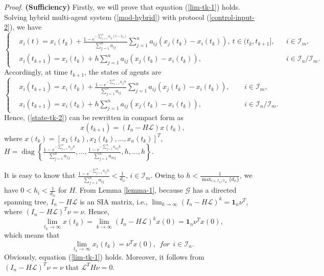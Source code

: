 \documentclass[12pt,draftcls,onecolumn]{IEEEtran}
\DeclareMathOperator{\diag}{diag}
\begin{document}
{\it Proof.} \textbf{(Sufficiency)} Firstly, we will prove that equation (\ref{lim-tk-1}) holds. Solving hybrid multi-agent system (\ref{mod-hybrid}) with protocol (\ref{control-input-2}), we have
\begin{equation}\label{state-t-2}
\left\{
\begin{aligned}
&x_i(t)=x_i(t_k)+\frac{1-e^{-\sum_{j=1}^na_{ij}(t-t_k)}}{\sum_{j=1}^na_{ij}}\sum_{j=1}^na_{ij}(x_j(t_k)-x_i(t_k)),~t\in (t_k,t_{k+1}], &&i\in \mathcal{I}_m,\\
&x_i(t_{k+1})=x_i(t_k)+h\sum_{j=1}^na_{ij}(x_j(t_k)-x_i(t_k)), && i\in\mathcal{I}_{n}/\mathcal{I}_{m}.
\end{aligned}
\right.
\end{equation}
Accordingly, at time $t_{k+1}$, the states of agents are
\begin{equation}\label{state-tk-2}
\left\{
\begin{aligned}
&x_i(t_{k+1})=x_i(t_k)+\frac{1-e^{-\sum_{j=1}^na_{ij}h}}{\sum_{j=1}^na_{ij}}\sum_{j=1}^na_{ij}(x_j(t_k)-x_i(t_k)), ~~&&i\in \mathcal{I}_m,\\
&x_i(t_{k+1})=x_i(t_k)+h\sum_{j=1}^na_{ij}(x_j(t_k)-x_i(t_k)), && i\in\mathcal{I}_{n}/\mathcal{I}_{m}.
\end{aligned}
\right.
\end{equation}
Hence, (\ref{state-tk-2}) can be rewritten in compact form as
\begin{equation}\label{state-tk-2m}
x(t_{k+1})=(I_n-H\mathscr{L})x(t_{k}),
\end{equation}
where $x(t_k)=[x_1(t_k),x_2(t_k),...,x_n(t_k)]^T$, $H=\diag\left\{\frac{1-e^{-\sum_{j=1}^na_{1j}h}}{\sum_{j=1}^na_{1j}},
\dots,\frac{1-e^{-\sum_{j=1}^na_{mj}h}}{\sum_{j=1}^na_{mj}},h,\dots,h\right\}$.


It is easy to know that $\frac{1-e^{-\sum_{j=1}^na_{ij}h}}{\sum_{j=1}^na_{ij}}<\frac{1}{d_{ii}}$, $i\in \mathcal{I}_m$. Owing to $h<\frac{1}{\max_{i\in\mathcal{I}_{n}/\mathcal{I}_{m}}\{d_{ii}\}}$, we have $0<h_{i}<\frac{1}{d_{ii}}$ for $H$.  From Lemma \ref{lemma-1}, because $\mathscr{G}$ has a directed spanning tree, $I_n-H\mathscr{L}$ is an SIA matrix, i.e.,
$\lim_{k\rightarrow \infty} (I_n-H\mathscr{L})^k=\mathbf{1}_n\nu^T$,
where $(I_n-H\mathscr{L})^T\nu=\nu$. Hence,
\[
\lim_{t_k\rightarrow \infty}x(t_{k})=\lim_{k\rightarrow \infty}(I_n-H\mathscr{L})^kx(0)=\mathbf{1}_n\nu^T x(0),
\]
which means that
\[
\lim_{t_k\rightarrow \infty}x_i(t_{k})=\nu^T x(0),~~for~~i\in \mathcal{I}_{n}.
\]
Obviously, equation (\ref{lim-tk-1}) holds. Moreover, it follows from $(I_n-H\mathscr{L})^T\nu=\nu$ that $\mathscr{L}^TH\nu=0$.
\end{document}
